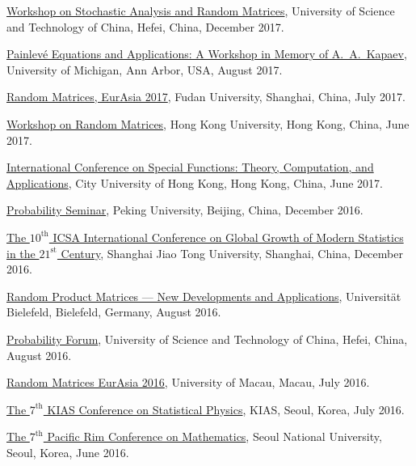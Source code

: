 \documentclass[12pt,a4paper]{article}
\newenvironment{item_list}{
 \begin{list}{}{
   \setlength{\leftmargin}{1.5em}
   \setlength{\itemsep}{0.25em}
   \setlength{\parskip}{0pt}
   \setlength{\parsep}{0.25em}
 }
}{
 \end{list}
}
\begin{document}
\begin{item_list}
  \href{http://wulab.ustc.edu.cn/bencandy.php?fid=61&id=1688}{Workshop on Stochastic Analysis and Random Matrices}, University of Science and Technology of China, Hefei, China, December 2017.
\item
  \href{https://lsa.umich.edu/math/centers-outreach/mcaim/painleve-equations-workshop--august-25-29--2017.html}{Painlev\'{e} Equations and Applications: A Workshop in Memory of A.~A.~Kapaev}, University of Michigan, Ann Arbor, USA, August 2017.
\item
  \href{http://www.fst.umac.mo/en/staff/documents/yayangchen/Workshop%20on%20RMT17.pdf}{Random Matrices, EurAsia 2017}, Fudan University, Shanghai, China, July 2017.
\item
  \href{http://hkumath.hku.hk/~imr/records1617/Workshop%20on%20Random%20Matrices_2017Jun16.pdf}{Workshop on Random Matrices}, Hong Kong University, Hong Kong, China, June 2017.
\item 
  \href{http://www6.cityu.edu.hk/rcms/icsf2017/index.htm}{International Conference on Special Functions: Theory, Computation, and Applications}, City University of Hong Kong, Hong Kong, China, June 2017.
\item
  \href{http://www.math.pku.edu.cn/teachers/liuyong/seminar/wangdong2016.pdf}{Probability Seminar}, Peking University, Beijing, China, December 2016.
\item
  \href{http://www.math.sjtu.edu.cn/conference/2016icsa/}{The $10^{\text{th}}$ ICSA International Conference on Global Growth of Modern Statistics in the $21^{\text{st}}$ Century}, Shanghai Jiao Tong University, Shanghai, China, December 2016.
\item
  \href{https://www2.physik.uni-bielefeld.de/rpm_2016.html}{Random Product Matrices --- New Developments and Applications}, Universit\"{a}t Bielefeld, Bielefeld, Germany, August 2016.
\item
  \href{http://home.ustc.edu.cn/~shanamy3/index.html}{Probability Forum}, University of Science and Technology of China, Hefei, China, August 2016.
\item
  \href{http://www.fst.umac.mo/conference/RandomMatricesEurAsia2016/Abstracts/Blower_abstract.pdf}{Random Matrices EurAsia 2016}, University of Macau, Macau, July 2016.
\item 
  \href{http://home.kias.re.kr/psec/nspcs16/}{The $7^{\text{th}}$ KIAS Conference on Statistical Physics}, KIAS, Seoul, Korea, July 2016.
\item
  \href{http://prcm.math.snu.ac.kr/}{The $7^{\text{th}}$ Pacific Rim Conference on Mathematics}, Seoul National University, Seoul, Korea, June 2016.

\end{item_list}
\end{document}
